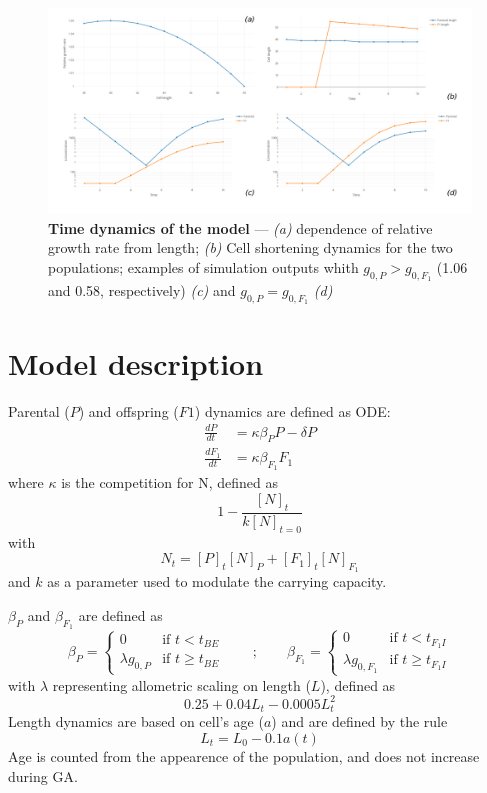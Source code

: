 \documentclass[a4paper,oneside]{book}
\begin{document}
    \begin{figure}[h]
      \includegraphics[width=\linewidth]{imgs/Figpan.pdf}
      \caption{\textbf{Time dynamics of the model} --- \textit{(a)} dependence of relative growth rate from length; \textit{(b)} Cell shortening dynamics for the two populations; examples of simulation outputs whith $g_{0,P} >g_{0,F_{1}}$ (1.06 and 0.58, respectively) \textit{(c)} and $g_{0,P} = g_{0,F_{1}}$ \textit{(d)}}\label{fdyn}
    \end{figure}
%
  \section*{Model description}
    Parental ($P$) and offspring ($F1$) dynamics are defined as ODE:\@
    \begin{align}
      \frac{dP}{dt}     &= \kappa \beta_{P}     P - \delta P \\
      \frac{dF_{1}}{dt} &= \kappa \beta_{F_{1}} F_{1}
    \end{align}
    where $\kappa$ is the competition for N, defined as
    \[
      1 - \frac{{[N]}_{t}}{k{[N]}_{t=0}}
    \]
    with 
    \[
      N_{t} = {[P]}_{t} {[N]}_{P} + {[F_{1}]}_{t} {[N]}_{F_{1}}
    \]
    and $k$ as a parameter used to modulate the carrying capacity.

    $\beta_{P}$  and $\beta_{F_{1}}$ are defined as
    \[
      \beta_{P} =
        \begin{cases}
          0               & \mbox{if } t < t_{BE} \\
          \lambda g_{0, P} & \mbox{if } t \geq t_{BE}
        \end{cases}
      \qquad;\qquad
      \beta_{F_{1}} = 
        \begin{cases}
          0                   & \mbox{if } t < t_{F_{1}I} \\
          \lambda g_{0, F_{1}} & \mbox{if } t \geq t_{F_{1}I}
        \end{cases}
    \]
    with $\lambda$ representing allometric scaling on length ($L$), defined as
    \[
      0.25 + 0.04 L_{t} - 0.0005 L_{t}^{2}
    \]
    Length dynamics are based on cell's age ($a$) and are defined by the rule
    \[
      L_{t} = L_{0} - 0.1 a(t)
    \]
    Age is counted from the appearence of the population, and does not increase during GA.\@
\end{document}
